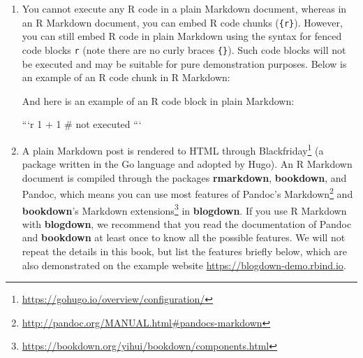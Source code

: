 \documentclass[12pt,]{krantz}
\makeatletter
\newenvironment{Shaded}{\begin{snugshade}}{\end{snugshade}}
\newcommand{\NormalTok}[1]{#1}
\renewcommand{\href}[2]{#2\footnote{\url{#1}}}
\newenvironment{kframe}{%
\medskip{}
\setlength{\fboxsep}{.8em}
 \def\at@end@of@kframe{}%
 \ifinner\ifhmode%
  \def\at@end@of@kframe{\end{minipage}}%
  \begin{minipage}{\columnwidth}%
 \fi\fi%
 \def\FrameCommand##1{\hskip\@totalleftmargin \hskip-\fboxsep
 \colorbox{shadecolor}{##1}\hskip-\fboxsep
     \hskip-\linewidth \hskip-\@totalleftmargin \hskip\columnwidth}%
 \MakeFramed {\advance\hsize-\width
   \@totalleftmargin\z@ \linewidth\hsize
   \@setminipage}}%
 {\par\unskip\endMakeFramed%
 \at@end@of@kframe}
\renewenvironment{Shaded}{\begin{kframe}}{\end{kframe}}
\theoremstyle{definition}
\theoremstyle{definition}
\theoremstyle{definition}
\theoremstyle{remark}
\makeatother
\begin{document}
\begin{enumerate}
\def\labelenumi{\arabic{enumi}.}
\item
  You cannot execute any R code in a plain Markdown document, whereas in
  an R Markdown document, you can embed R code chunks
  (\texttt{\textasciigrave{}\textasciigrave{}\textasciigrave{}\{r\}}).
  However, you can still embed R code in plain Markdown using the syntax
  for fenced code blocks
  \texttt{\textasciigrave{}\textasciigrave{}\textasciigrave{}r} (note
  there are no curly braces \texttt{\{\}}). Such code blocks will not be
  executed and may be suitable for pure demonstration purposes. Below is
  an example of an R code chunk in R Markdown:

\begin{Shaded}
\end{Shaded}

  And here is an example of an R code block in plain Markdown:

\begin{Shaded}
\begin{Highlighting}[]
\NormalTok{```r}
\NormalTok{1 + 1  # not executed}
\NormalTok{```}
\end{Highlighting}
\end{Shaded}
\item
  A plain Markdown post is rendered to HTML through
  \href{https://gohugo.io/overview/configuration/}{Blackfriday}
  (a package written in the Go language and adopted
  by Hugo). An R Markdown document is compiled through the packages
  \textbf{rmarkdown}, \textbf{bookdown}, and Pandoc, which
  means you can use most features of
  \href{http://pandoc.org/MANUAL.html\#pandocs-markdown}{Pandoc's
  Markdown} and
  \href{https://bookdown.org/yihui/bookdown/components.html}{\textbf{bookdown}'s
  Markdown extensions} in \textbf{blogdown}. If you use R Markdown
  \citep{R-rmarkdown} with \textbf{blogdown}, we recommend that you read
  the documentation of Pandoc and \textbf{bookdown} at least once to
  know all the possible features. We will not repeat the details in this
  book, but list the features briefly below, which are also demonstrated
  on the example website \url{https://blogdown-demo.rbind.io}.


\end{enumerate}
\end{document}
